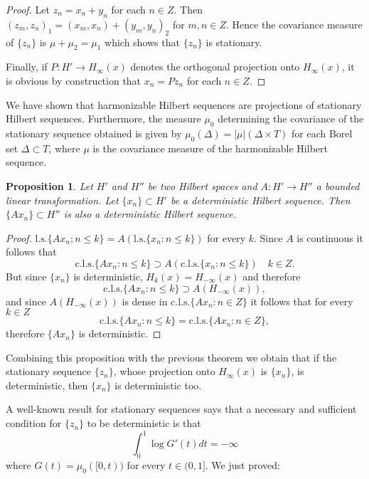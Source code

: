 \documentclass{article}
\newtheorem{proposition}{Proposition}
\begin{document}
\begin{proof}
Let $z_n = x_n + y_n$ for each $n \in Z$. Then $(z_m, z_n)_1 = (x_m, x_n) + (y_m, y_n)_2$ for
$m, n \in Z$. Hence the covariance measure of $\{z_n\}$ is $\mu + \mu_2 = \mu_1$ which shows that
$\{z_n\}$ is stationary.

Finally, if $P:H' \to H_{\infty}(x)$ denotes the orthogonal projection onto $H_{\infty}(x)$,
it is obvious by construction that $x_n = Pz_n$ for each $n \in Z$. 
\end{proof}

We have shown that harmonizable Hilbert sequences are projections of stationary Hilbert sequences. Furthermore, the measure $\mu_0$ determining the covariance of the stationary sequence obtained is given by $\mu_0(\Delta) = |\mu|(\Delta \times T)$
for each Borel set $\Delta \subset T$, where $\mu$ is the covariance measure of the harmonizable
Hilbert sequence.

\begin{proposition}
Let $H'$ and $H''$ be two Hilbert spaces and $A:H' \to H''$ a bounded
linear transformation. Let $\{x_n\} \subset H'$ be a deterministic Hilbert sequence. Then
$\{Ax_n\} \subset H''$ is also a deterministic Hilbert sequence.
\end{proposition}

\begin{proof}
$\text{l.s.}\{Ax_n; n \leq k\} = A(\text{l.s.}\{x_n:n \leq k\})$ for every $k$. Since $A$ is continuous
it follows that
\begin{equation}
\text{c.l.s.}\{Ax_n:n \leq k\} \supset A(\text{c.l.s.}\{x_n:n \leq k\}) \quad k \in Z.
\end{equation}
But since $\{x_n\}$ is deterministic, $H_k(x) = H_{-\infty}(x)$ and therefore
\begin{equation}
\text{c.l.s.}\{Ax_n:n \leq k\} \supset A(H_{-\infty}(x)),
\end{equation}
and since $A(H_{-\infty}(x))$ is dense in $\text{c.l.s.}\{Ax_n:n \in Z\}$ it follows that for every $k \in Z$
\begin{equation}
\text{c.l.s.}\{Ax_n:n \leq k\} = \text{c.l.s.}\{Ax_n:n \in Z\},
\end{equation}
therefore $\{Ax_n\}$ is deterministic.
\end{proof}

Combining this proposition with the previous theorem we obtain that if the
stationary sequence $\{z_n\}$, whose projection onto $H_{\infty}(x)$ is $\{x_n\}$, is deterministic,
then $\{x_n\}$ is deterministic too.

A well-known result for stationary sequences \cite{doob, rozanov} says that a necessary
and sufficient condition for $\{z_n\}$ to be deterministic is that
\begin{equation}
\int_0^1 \log G'(t) dt = -\infty
\end{equation}
where $G(t) = \mu_0([0, t))$ for every $t \in (0, 1]$. We just proved:
\end{document}
